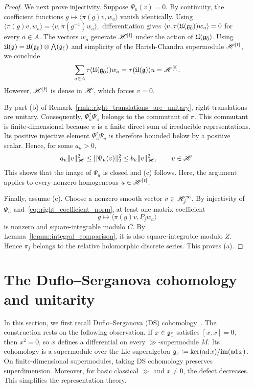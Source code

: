 \begin{proof}
We next prove injectivity. Suppose $\Psi_u(v)=0$. By continuity, the coefficient functions $g\mapsto\langle\pi(g)v,w_a\rangle$ vanish identically. Using
$
\langle\pi(g)v,w_a\rangle=\langle v,\pi(g^{-1})w_a\rangle,
$
differentiation gives
$
\langle v,\tau({\mathfrak U}({\mathfrak{g}_{\bar{0}}}))w_a\rangle=0
$
for every $a\in A$.
The vectors $w_a$ generate ${\mathscr{H}}^{[{\mathfrak k}]}$ under the action of ${\mathfrak U}({\mathfrak{g}_{\bar{0}}})$. Using ${\mathfrak U}({\mathfrak{g}})={\mathfrak U}({\mathfrak{g}_{\bar{0}}})\otimes \bigwedge({\mathfrak{g}_{\bar{1}}})$ and simplicity of the Harish-Chandra supermodule ${\mathscr{H}}^{[{\mathfrak k}]}$, we conclude
\[
\sum_{a\in A}\tau({\mathfrak U}({\mathfrak{g}_{\bar{0}}}))w_a
=
\tau({\mathfrak U}({\mathfrak{g}}))u
=
{\mathscr{H}}^{[{\mathfrak k}]}.
\]
However, ${\mathscr{H}}^{[{\mathfrak k}]}$ is dense in ${\mathscr{H}}$, which forces $v=0$.

By part (b) of Remark~\ref{rmk::right_translations_are_unitary}, right translations are unitary.
Consequently, $\Psi_u^\ast\Psi_u$ belongs to the commutant of
$\pi$. This commutant is finite-dimensional because $\pi$ is
a finite direct sum of irreducible representations.
Its positive injective element $\Psi_u^\ast\Psi_u$ is therefore
bounded below by a positive scalar. Hence, for some $a_u>0$,
\begin{equation}
\label{eq::coefficient_transform_bounds}
a_u\|v\|_{{\mathscr{H}}}^2
\leq
\|\Psi_u(v)\|_2^2
\leq
b_u\|v\|_{{\mathscr{H}}}^2,
\qquad v\in{\mathscr{H}}.
\end{equation}
This shows that the image of $\Psi_{u}$ is closed and (c) follows. Here, the argument applies to every nonzero homogeneous
$u\in{\mathscr{H}}^{[{\mathfrak k}]}$.


Finally, assume (c). Choose a nonzero smooth vector $v\in{\mathscr{H}}_j^{\infty}$. By injectivity of $\Psi_u$ and~\eqref{eq::right_coefficient_norm}, at least one matrix coefficient
\[
g\longmapsto\langle\pi(g)v,P_jw_a\rangle
\]
is nonzero and square-integrable modulo $C$. By Lemma~\ref{lemm::integral_comparison}, it is also square-integrable modulo $Z$. Hence $\pi_j$ belongs to the relative holomorphic discrete series. This proves (a).
\end{proof}


\section{The Duflo--Serganova cohomology and unitarity}
\label{sec::DS_functor_and_unitarity}
\noindent
In this section, we first recall Duflo--Serganova (DS) cohomology~\cite{duflo2005associated,GorelikSherman2024}. The construction rests on the following observation. If $x\in{\mathfrak{g}_{\bar{1}}}$ satisfies $[x,x]=0$, then $x^2=0$, so $x$ defines a differential on every $\gg$-supermodule $M$. Its cohomology is a supermodule over the Lie superalgebra ${\mathfrak{g}}_x\coloneqq\ker(\operatorname{ad} x)/{\operatorname{im}}(\operatorname{ad} x)$. On finite-dimensional supermodules, taking DS cohomology preserves superdimension. Moreover, for basic classical $\gg$ and $x\neq0$, the defect decreases. This simplifies the representation theory. 


